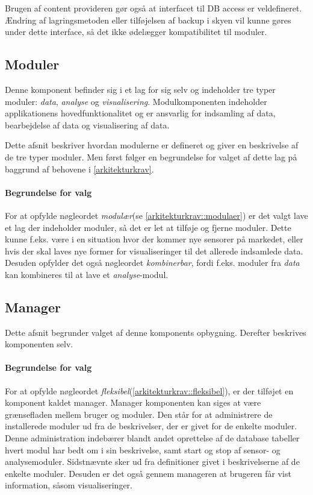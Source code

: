 Brugen af content provideren gør også at interfacet til DB access er veldefineret.
Ændring af lagringsmetoden eller tilføjelsen af backup i skyen vil kunne gøres under dette interface, så det ikke ødelægger kompatibilitet til moduler.

\subsection{Moduler}
Denne komponent befinder sig i et lag for sig selv og indeholder tre typer moduler: \textit{data}, \textit{analyse} og \textit{visualisering}.
Modulkomponenten indeholder applikationens hovedfunktionalitet og er ansvarlig for indsamling af data, bearbejdelse af data og visualisering af data.

Dette afsnit beskriver hvordan modulerne er defineret og giver en beskrivelse af de tre typer moduler.
Men først følger en begrundelse for valget af dette lag på baggrund af behovene i \cref{arkitekturkrav}.

\paragraph{Begrundelse for valg}
For at opfylde nøgleordet \textit{modulær}(se \cref{arkitekturkrav::modulaer}) er det valgt lave et lag der indeholder moduler, så det er let at tilføje og fjerne moduler.
Dette kunne f.eks. være i en situation hvor der kommer nye sensorer på markedet, eller hvis der skal laves nye former for visualiseringer til det allerede indsamlede data.
Desuden opfylder det også nøgleordet \textit{kombinerbar}, fordi f.eks. moduler fra \textit{data} kan kombineres til at lave et \textit{analyse}-modul.



\subsection{Manager}\label{subsec:arkitektur-Manager}
Dette afsnit begrunder valget af denne komponents opbygning.
Derefter beskrives komponenten selv.

\paragraph{Begrundelse for valg}
For at opfylde nøgleordet \textit{fleksibel}(\cref{arkitekturkrav::fleksibel}), er der tilføjet en komponent kaldet manager.
Manager komponenten kan siges at være grænsefladen mellem bruger og moduler.
Den står for at administrere de installerede moduler ud fra de beskrivelser, der er givet for de enkelte moduler.
Denne administration indebærer blandt andet oprettelse af de database tabeller hvert modul har bedt om i sin beskrivelse, samt start og stop af sensor- og analysemoduler.
Sidstnævnte sker ud fra definitioner givet i beskrivelserne af de enkelte moduler.
Desuden er det også gennem manageren at brugeren får vist information, såsom visualiseringer.

